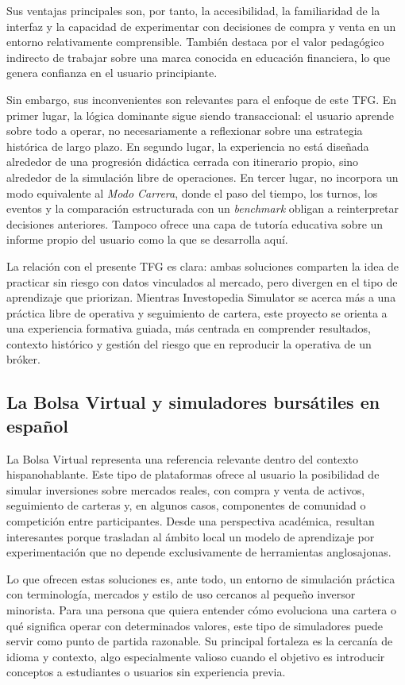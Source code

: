 Sus ventajas principales son, por tanto, la accesibilidad, la familiaridad de la interfaz y la capacidad de experimentar con decisiones de compra y venta en un entorno relativamente comprensible. También destaca por el valor pedagógico indirecto de trabajar sobre una marca conocida en educación financiera, lo que genera confianza en el usuario principiante.

Sin embargo, sus inconvenientes son relevantes para el enfoque de este TFG. En primer lugar, la lógica dominante sigue siendo transaccional: el usuario aprende sobre todo a operar, no necesariamente a reflexionar sobre una estrategia histórica de largo plazo. En segundo lugar, la experiencia no está diseñada alrededor de una progresión didáctica cerrada con itinerario propio, sino alrededor de la simulación libre de operaciones. En tercer lugar, no incorpora un modo equivalente al \textit{Modo Carrera}, donde el paso del tiempo, los turnos, los eventos y la comparación estructurada con un \textit{benchmark} obligan a reinterpretar decisiones anteriores. Tampoco ofrece una capa de tutoría educativa sobre un informe propio del usuario como la que se desarrolla aquí.

La relación con el presente TFG es clara: ambas soluciones comparten la idea de practicar sin riesgo con datos vinculados al mercado, pero divergen en el tipo de aprendizaje que priorizan. Mientras Investopedia Simulator se acerca más a una práctica libre de operativa y seguimiento de cartera, este proyecto se orienta a una experiencia formativa guiada, más centrada en comprender resultados, contexto histórico y gestión del riesgo que en reproducir la operativa de un bróker.

\subsection{La Bolsa Virtual y simuladores bursátiles en español}

La Bolsa Virtual \cite{bolsavirtual} representa una referencia relevante dentro del contexto hispanohablante. Este tipo de plataformas ofrece al usuario la posibilidad de simular inversiones sobre mercados reales, con compra y venta de activos, seguimiento de carteras y, en algunos casos, componentes de comunidad o competición entre participantes. Desde una perspectiva académica, resultan interesantes porque trasladan al ámbito local un modelo de aprendizaje por experimentación que no depende exclusivamente de herramientas anglosajonas.

Lo que ofrecen estas soluciones es, ante todo, un entorno de simulación práctica con terminología, mercados y estilo de uso cercanos al pequeño inversor minorista. Para una persona que quiera entender cómo evoluciona una cartera o qué significa operar con determinados valores, este tipo de simuladores puede servir como punto de partida razonable. Su principal fortaleza es la cercanía de idioma y contexto, algo especialmente valioso cuando el objetivo es introducir conceptos a estudiantes o usuarios sin experiencia previa.

